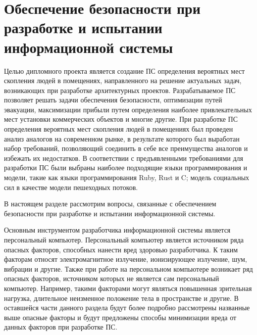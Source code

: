 \section{Обеспечение безопасности при разработке и испытании информационной системы}

Целью дипломного проекта является создание ПС определения вероятных мест скопления людей в помещениях,
направленного на решение актуальных задач, возникающих при разработке архитектурных проектов.
Разрабатываемое ПС позволяет решать задачи обеспечения безопасности, оптимизации путей эвакуации,
максимизации прибыли путем определения наиболее привлекательных мест установки коммерческих объектов и многие другие.
При разработке ПС определения вероятных мест скопления людей в помещениях был проведен анализ аналогов на современном рынке,
в результате которого был выработан набор требований, позволяющий соединить в себе все преимущества аналогов и избежать их недостатков.
В соответствии с предъявленными требованиями для разработки ПС были выбраны наиболее подходящие языки программирования и модели, такие как
языки программирования Ruby, Rust и C; модель социальных сил в качестве модели пешеходных потоков.

В настоящем разделе рассмотрим вопросы, связанные с обеспечением безопасности при разработке и испытании информационной системы.

Основным инструментом разработчика информационной системы является персональный компьютер.
Персональный компьютер является источником ряда опасных факторов, способных нанести вред здоровью разработчика.
К таким факторам относят электромагнитное излучение, ионизирующее излучение, шум, вибрации и другие.
Также при работе на персональном компьютере возникает ряд опасных факторов, источником которых не является сам персональный компьютер.
Например, такими факторами могут являться повышенная зрительная нагрузка, длительное неизменное положение тела в пространстве и другие.
В оставшейся части данного раздела будут более подробно рассмотрены названные выше опасные факторы
и будут предложены способы минимизации вреда от данных факторов при разработке ПС.

